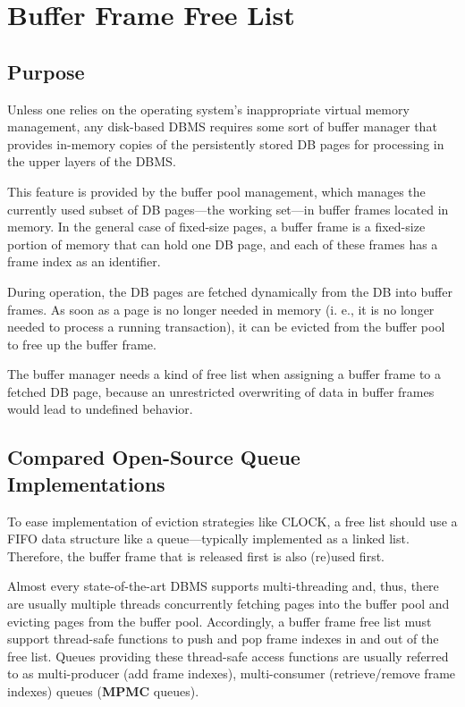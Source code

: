 \chapter[Buffer Frame Free List]{Buffer Frame Free List} \label{ch:free-list}

\section[Purpose]{Purpose}

    Unless one relies on the operating system's inappropriate virtual memory management, any disk-based DBMS requires some sort of buffer manager that provides in-memory copies of the persistently stored DB pages for processing in the upper layers of the DBMS.

    This feature is provided by the buffer pool management, which manages the currently used subset of DB pages---the working set---in buffer frames located in memory. In the general case of fixed-size pages, a buffer frame is a fixed-size portion of memory that can hold one DB page, and each of these frames has a frame index as an identifier.

    During operation, the DB pages are fetched dynamically from the DB into buffer frames. As soon as a page is no longer needed in memory (i. e., it is no longer needed to process a running transaction), it can be evicted from the buffer pool to free up the buffer frame.

    The buffer manager needs a kind of free list when assigning a buffer frame to a fetched DB page, because an unrestricted overwriting of data in buffer frames would lead to undefined behavior.

\section[Compared Open-Source Queue Implementations]{Compared Open-Source Queue Implementations}

    To ease implementation of eviction strategies like CLOCK, a free list should use a FIFO data structure like a queue---typically implemented as a linked list. Therefore, the buffer frame that is released first is also (re)used first.

    Almost every state-of-the-art DBMS supports multi-threading and, thus, there are usually multiple threads concurrently fetching pages into the buffer pool and evicting pages from the buffer pool. Accordingly, a buffer frame free list must support thread-safe functions to push and pop frame indexes in and out of the free list. Queues providing these thread-safe access functions are usually referred to as multi-producer (add frame indexes), multi-consumer (retrieve/remove frame indexes) queues (\textbf{MPMC} queues).
	
